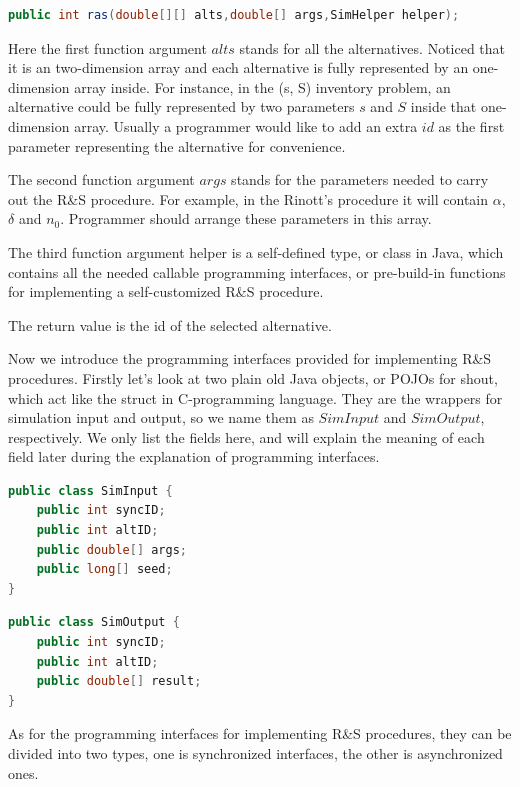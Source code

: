 \begin{lstlisting}[language=Java]
public int ras(double[][] alts,double[] args,SimHelper helper);
\end{lstlisting}

Here the first function argument $alts$ stands for all the alternatives. Noticed that it is an two-dimension array and each alternative is fully represented by an one-dimension array inside. For instance, in the (s, S) inventory problem, an alternative could be fully represented by two parameters $s$ and $S$ inside that one-dimension array. Usually a programmer would like to add an extra $id$ as the first parameter representing the alternative for convenience.

The second function argument $args$ stands for the parameters needed to carry out the R\&S procedure. For example, in the Rinott's procedure it will contain $\alpha$, $\delta$ and $n_0$. Programmer should arrange these parameters in this array.

The third function argument helper is a self-defined type, or class in Java, which contains all the needed callable programming interfaces, or pre-build-in functions for implementing a self-customized R\&S procedure.

The return value is the id of the selected alternative.

Now we introduce the programming interfaces provided for implementing R\&S procedures. Firstly let's look at two plain old Java objects, or POJOs for shout, which act like the struct in C-programming language. They are the wrappers for simulation input and output, so we name them as $SimInput$ and $SimOutput$, respectively. We only list the fields here, and will explain the meaning of each field later during the explanation of programming interfaces.

\begin{lstlisting}[language=Java]
public class SimInput {
	public int syncID;
	public int altID;
	public double[] args;
	public long[] seed;
}
\end{lstlisting}

\begin{lstlisting}[language=Java]
public class SimOutput {
	public int syncID;
	public int altID;
	public double[] result;
}
\end{lstlisting}

As for the programming interfaces for implementing R\&S procedures, they can be divided into two types, one is synchronized interfaces, the other is asynchronized ones.

